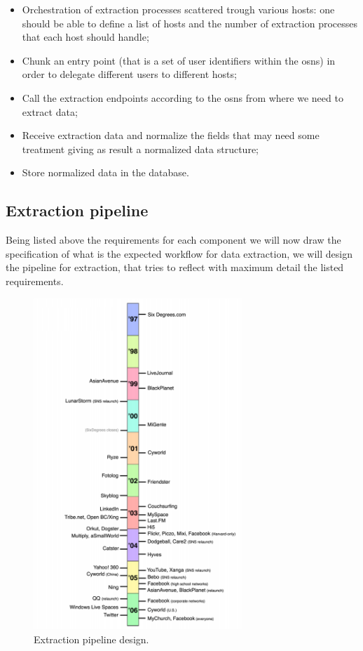 \begin{itemize}
    \item Orchestration of extraction processes scattered trough various hosts: one should be able to define a list of hosts and the number of extraction processes that each host should handle;
    \item Chunk an entry point (that is a set of user identifiers within the \glspl{osn}) in order to delegate different users to different hosts;
    \item Call the extraction endpoints according to the \glspl{osn} from where we need to extract data;
    \item Receive extraction data and normalize the fields that may need some treatment giving as result a normalized data structure;
    \item Store normalized data in the database.
\end{itemize}

\subsection{Extraction pipeline}
Being listed above the requirements for each component we will now draw the specification of what is the expected workflow for data extraction, we will design the pipeline for extraction, that tries to reflect with maximum detail the listed requirements.

\begin{figure}[h!]
\begin{center}
  \includegraphics[width=0.7\textwidth]{img/timeline.png}
\end{center}
\caption{\label{img:extpipeline} Extraction pipeline design.}
\end{figure}

